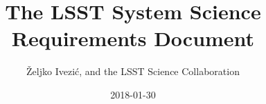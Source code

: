 \documentclass[SE,toc]{lsstdoc}
\title{The LSST System Science Requirements Document}
\author{\v{Z}eljko {Ivezi{\'c}}, and the LSST Science Collaboration}
\date{2018-01-30}
\begin{document}
\maketitle













\newpage
\printglossary
\end{document}

